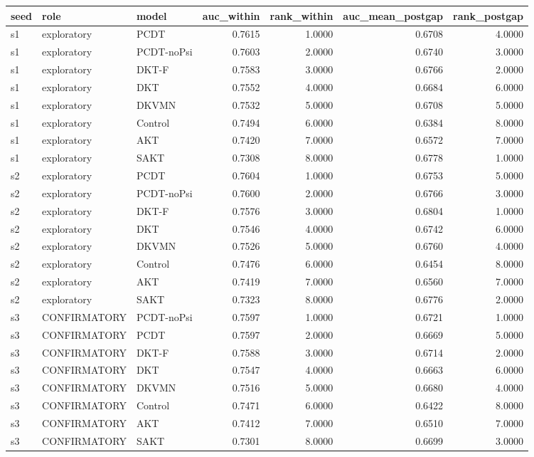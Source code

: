 \begin{tabular}{lllrrrr}
\toprule
seed & role & model & auc\_within & rank\_within & auc\_mean\_postgap & rank\_postgap \\
\midrule
s1 & exploratory & PCDT & 0.7615 & 1.0000 & 0.6708 & 4.0000 \\
s1 & exploratory & PCDT-noPsi & 0.7603 & 2.0000 & 0.6740 & 3.0000 \\
s1 & exploratory & DKT-F & 0.7583 & 3.0000 & 0.6766 & 2.0000 \\
s1 & exploratory & DKT & 0.7552 & 4.0000 & 0.6684 & 6.0000 \\
s1 & exploratory & DKVMN & 0.7532 & 5.0000 & 0.6708 & 5.0000 \\
s1 & exploratory & Control & 0.7494 & 6.0000 & 0.6384 & 8.0000 \\
s1 & exploratory & AKT & 0.7420 & 7.0000 & 0.6572 & 7.0000 \\
s1 & exploratory & SAKT & 0.7308 & 8.0000 & 0.6778 & 1.0000 \\
s2 & exploratory & PCDT & 0.7604 & 1.0000 & 0.6753 & 5.0000 \\
s2 & exploratory & PCDT-noPsi & 0.7600 & 2.0000 & 0.6766 & 3.0000 \\
s2 & exploratory & DKT-F & 0.7576 & 3.0000 & 0.6804 & 1.0000 \\
s2 & exploratory & DKT & 0.7546 & 4.0000 & 0.6742 & 6.0000 \\
s2 & exploratory & DKVMN & 0.7526 & 5.0000 & 0.6760 & 4.0000 \\
s2 & exploratory & Control & 0.7476 & 6.0000 & 0.6454 & 8.0000 \\
s2 & exploratory & AKT & 0.7419 & 7.0000 & 0.6560 & 7.0000 \\
s2 & exploratory & SAKT & 0.7323 & 8.0000 & 0.6776 & 2.0000 \\
s3 & CONFIRMATORY & PCDT-noPsi & 0.7597 & 1.0000 & 0.6721 & 1.0000 \\
s3 & CONFIRMATORY & PCDT & 0.7597 & 2.0000 & 0.6669 & 5.0000 \\
s3 & CONFIRMATORY & DKT-F & 0.7588 & 3.0000 & 0.6714 & 2.0000 \\
s3 & CONFIRMATORY & DKT & 0.7547 & 4.0000 & 0.6663 & 6.0000 \\
s3 & CONFIRMATORY & DKVMN & 0.7516 & 5.0000 & 0.6680 & 4.0000 \\
s3 & CONFIRMATORY & Control & 0.7471 & 6.0000 & 0.6422 & 8.0000 \\
s3 & CONFIRMATORY & AKT & 0.7412 & 7.0000 & 0.6510 & 7.0000 \\
s3 & CONFIRMATORY & SAKT & 0.7301 & 8.0000 & 0.6699 & 3.0000 \\
\bottomrule
\end{tabular}
